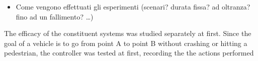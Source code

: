 	\begin{itemize}
		
		\item Come vengono effettuati gli esperimenti (scenari? durata fissa? ad oltranza? fino ad un fallimento? \dots)
		
	\end{itemize}

The efficacy of the constituent systems was studied separately at first. Since the goal of a vehicle is to go from point A to point B without crashing or hitting a pedestrian, the controller was tested at first, recording the the actions performed 